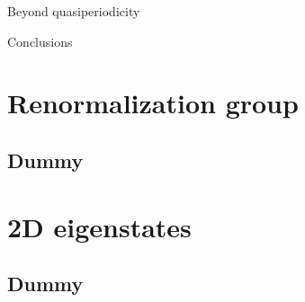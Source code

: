 \begin{frame}{Beyond quasiperiodicity}

\end{frame}

\begin{frame}{Conclusions}

\end{frame}

\section{Renormalization group}
\subsection{Dummy}

\section{2D eigenstates}
\subsection{Dummy}